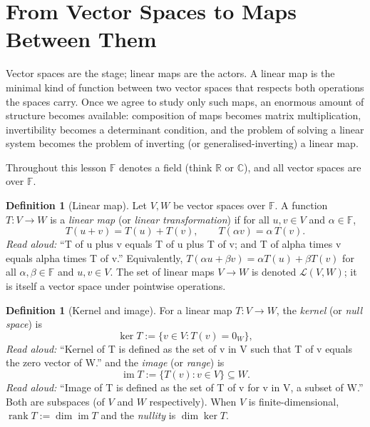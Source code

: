 \documentclass[11pt]{article}
\theoremstyle{plain}
\theoremstyle{definition}
\newtheorem{definition}[theorem]{Definition}
\DeclareMathOperator{\im}{im}
\DeclareMathOperator{\rank}{rank}
\begin{document}
\section{From Vector Spaces to Maps Between Them}

Vector spaces are the stage; linear maps are the actors. A linear map is the
minimal kind of function between two vector spaces that respects both
operations the spaces carry. Once we agree to study only such maps, an
enormous amount of structure becomes available: composition of maps becomes
matrix multiplication, invertibility becomes a determinant condition, and the
problem of solving a linear system becomes the problem of inverting (or
generalised-inverting) a linear map.

Throughout this lesson $\mathbb{F}$ denotes a field (think $\mathbb{R}$ or
$\mathbb{C}$), and all vector spaces are over $\mathbb{F}$.

\begin{definition}[Linear map]
Let $V, W$ be vector spaces over $\mathbb{F}$. A function $T \colon V \to W$
is a \emph{linear map} (or \emph{linear transformation}) if for all
$u, v \in V$ and $\alpha \in \mathbb{F}$,
\[
T(u + v) = T(u) + T(v), \qquad T(\alpha v) = \alpha\, T(v).
\]
\emph{Read aloud:} ``T of u plus v equals T of u plus T of v; and T of alpha times v equals alpha times T of v.''
Equivalently, $T(\alpha u + \beta v) = \alpha T(u) + \beta T(v)$ for all
$\alpha, \beta \in \mathbb{F}$ and $u, v \in V$. The set of linear maps
$V \to W$ is denoted $\mathcal{L}(V, W)$; it is itself a vector space under
pointwise operations.
\end{definition}

\begin{definition}[Kernel and image]
For a linear map $T \colon V \to W$, the \emph{kernel} (or \emph{null
space}) is
\[
\ker T := \{ v \in V : T(v) = 0_W \},
\]
\emph{Read aloud:} ``Kernel of T is defined as the set of v in V such that T of v equals the zero vector of W.''
and the \emph{image} (or \emph{range}) is
\[
\im T := \{ T(v) : v \in V \} \subseteq W.
\]
\emph{Read aloud:} ``Image of T is defined as the set of T of v for v in V, a subset of W.''
Both are subspaces (of $V$ and $W$ respectively). When $V$ is
finite-dimensional, $\rank T := \dim \im T$ and the \emph{nullity} is
$\dim \ker T$.
\end{definition}
\end{document}
